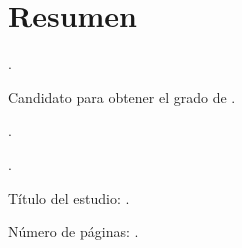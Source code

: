 
\chapter{Resumen}

{\renewcommand{\baselinestretch}{1.1}\selectfont
{\setlength{\leftskip}{10mm}
\setlength{\parindent}{-10mm}

\autor.

Candidato para obtener el grado de \grado\orientacion.

\uanl.

\fime.

Título del estudio: \textsc{\titulo}.

\noindent Número de páginas: \pageref*{lastpage}.}

}
